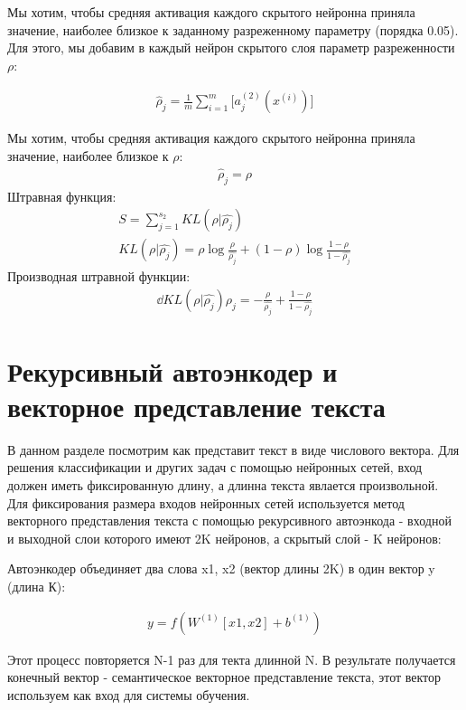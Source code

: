 \documentclass[12pt]{article}
\begin{document}
Мы хотим, чтобы средняя активация каждого скрытого нейронна приняла значение, наиболее близкое к заданному разреженному параметру (порядка 0.05). Для этого, мы добавим в каждый нейрон скрытого слоя параметр разреженности $\rho$:

  \begin{align}
	\hat \rho_j=\frac{1}{m}\sum_{i=1}^m\biggl[a^{(2)}_j(x^{(i)})\biggl]
  \end{align}

  Мы хотим, чтобы средняя активация каждого скрытого нейронна приняла значение, наиболее близкое к $\rho$:
  \begin{align}
	\hat \rho_j=\rho
  \end{align}
  Штравная функция:
  \begin{align}
	S=\sum_{j=1}^{s_2}{KL({\rho}|{\hat{\rho_j}})}\\
	KL({\rho}|{\hat{\rho_j}})=\rho\log{\frac{\rho}{\hat{\rho_j}}}+(1-\rho)\log{\frac{1-\rho}{1-\hat{\rho_j}}}
  \end{align}
  Производная штравной функции:
  \begin{align}
	\dd{KL({\rho}|{\hat{\rho_j}})}{\rho_j}=-\frac{\rho}{\hat{\rho_j}} + \frac{1-\rho}{1-\hat{\rho_j}}
  \end{align}

\section{Рекурсивный автоэнкодер и векторное представление текста}

В данном разделе посмотрим как представит текст в виде числового вектора. Для решения классификации и других задач с помощью нейронных сетей, вход должен иметь фиксированную длину, а длинна текста явлается произвольной. Для фиксирования размера входов нейронных сетей используется метод векторного представления текста с помощью рекурсивного автоэнкода - входной и выходной слои которого имеют 2K нейронов, а скрытый слой - K нейронов: 

Автоэнкодер объединяет два слова x1, x2 (вектор длины 2K) в один вектор y (длина К):

  \begin{align}
	y=f{(W^{(1)}[x1, x2] + b^{(1)})}
  \end{align}

Этот процесс повторяется N-1 раз для текта длинной N. В результате получается конечный вектор - семантическое векторное представление текста, этот вектор используем как вход для системы обучения.
\end{document}
